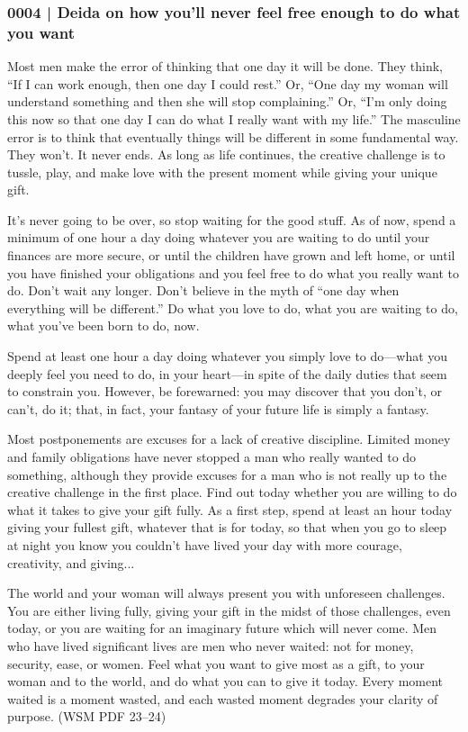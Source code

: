 		\subsubsection{0004 | Deida on how you'll never feel free enough to do what you want}
			\label{GM-LIFE-TIME-0004}
			
			Most men make the error of thinking that one day it will be done. They think, ``If I can work enough, then one day I could rest.'' Or, ``One day my woman will understand something and then she will stop complaining.'' Or, ``I'm only doing this now so that one day I can do what I really want with my life.'' The masculine error is to think that eventually things will be different in some fundamental way. They won't. It never ends. As long as life continues, the creative challenge is to tussle, play, and make love with the present moment while giving your unique gift. 

			It's never going to be over, so stop waiting for the good stuff. As of now, spend a minimum of one hour a day doing whatever you are waiting to do until your finances are more secure, or until the children have grown and left home, or until you have finished your obligations and you feel free to do what you really want to do. Don't wait any longer. Don't believe in the myth of ``one day when everything will be different.'' Do what you love to do, what you are waiting to do, what you've been born to do, now. 

			Spend at least one hour a day doing whatever you simply love to do---what you deeply feel you need to do, in your heart---in spite of the daily duties that seem to constrain you. However, be forewarned: you may discover that you don't, or can't, do it; that, in fact, your fantasy of your future life is simply a fantasy. 

			Most postponements are excuses for a lack of creative discipline. Limited money and family obligations have never stopped a man who really wanted to do something, although they provide excuses for a man who is not really up to the creative challenge in the first place. Find out today whether you are willing to do what it takes to give your gift fully. As a first step, spend at least an hour today giving your fullest gift, whatever that is for today, so that when you go to sleep at night you know you couldn't have lived your day with more courage, creativity, and giving...

			The world and your woman will always present you with unforeseen challenges. You are either living fully, giving your gift in the midst of those challenges, even today, or you are waiting for an imaginary future which will never come. Men who have lived significant lives are men who never waited: not for money, security, ease, or women. Feel what you want to give most as a gift, to your woman and to the world, and do what you can to give it today. Every moment waited is a moment wasted, and each wasted moment degrades your clarity of purpose. (WSM PDF 23--24)
			
